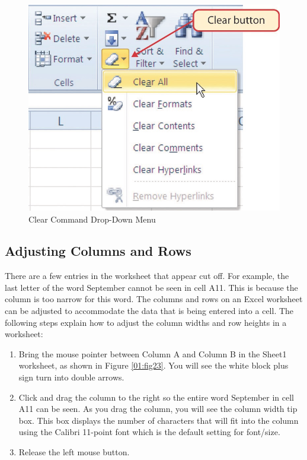 \begin{figure}[H]
	\centering
	\includegraphics[width=\maxwidth{.95\linewidth}]{gfx/ch01_fig22}
	\caption{Clear Command Drop-Down Menu}
	\label{01:fig22}
\end{figure}

\subsection{Adjusting Columns and Rows}

There are a few entries in the worksheet that appear cut off. For example, the last letter of the word September cannot be seen in cell \textsf{A11}. This is because the column is too narrow for this word. The columns and rows on an Excel worksheet can be adjusted to accommodate the data that is being entered into a cell. The following steps explain how to adjust the column widths and row heights in a worksheet:

\begin{enumerate}
	\item Bring the mouse pointer between Column A and Column B in the Sheet1 worksheet, as shown in Figure \ref{01:fig23}. You will see the white block plus sign turn into double arrows.
	\item Click and drag the column to the right so the entire word September in cell \textsf{A11} can be seen. As you drag the column, you will see the column width tip box. This box displays the number of characters that will fit into the column using the Calibri 11-point font which is the default setting for font/size.
	\item Release the left mouse button.
\end{enumerate}

